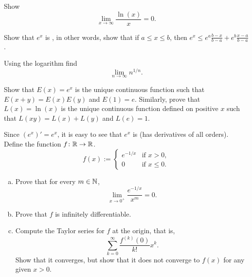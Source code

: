 \begin{exercise}
Show
\begin{equation*}
\lim_{x\to\infty} \frac{\ln(x)}{x} = 0 .
\end{equation*}
\end{exercise}

\begin{exercise}
Show that $e^x$ is \emph{}, in other words, show that 
if $a \leq x \leq b$, then
$e^x \leq e^a \frac{b-x}{b-a} + e^b \frac{x-a}{b-a}$.
\end{exercise}

\begin{exercise}
Using the logarithm find
\begin{equation*}
\lim_{n\to\infty} n^{1/n} .
\end{equation*}
\end{exercise}

\begin{exercise}
Show that $E(x) = e^x$ is the unique continuous function such that
$E(x+y) = E(x)E(y)$ and $E(1) = e$.   Similarly, prove that $L(x) = \ln(x)$
is the unique continuous
function defined on positive $x$ such that $L(xy) = L(x)+L(y)$
and $L(e) = 1$.
\end{exercise}

\begin{exercise}\label{exercise:nonanalytic}
Since $(e^x)' = e^x$, it is easy to see that $e^x$ is
(has derivatives of all orders).  Define the function $f \colon {\mathbb{R}} \to {\mathbb{R}}$.
\begin{equation*}
f(x) := \begin{cases}
e^{-1/x} & \text{if } x > 0, \\
0 & \text{if } x \leq 0.
\end{cases}
\end{equation*}
\begin{enumerate}[a)]
\item
Prove that for every $m \in {\mathbb{N}}$,
\begin{equation*}
\lim_{x \to 0^+} \frac{e^{-1/x}}{x^m} = 0 .
\end{equation*}
\item
Prove that $f$ is infinitely differentiable.
\item
Compute the Taylor series for $f$ at the origin, that is,
\begin{equation*}
\sum_{k=0}^\infty
\frac{f^{(k)}(0)}{k!}x^k .
\end{equation*}
Show that it converges, but show that it does not converge to $f(x)$
for any given $x > 0$.
\end{enumerate}
\end{exercise}

